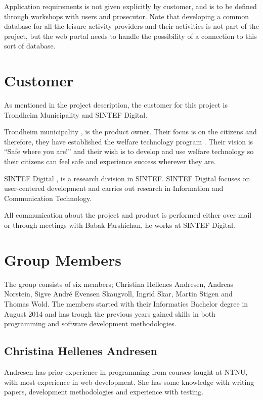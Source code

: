 Application requirements is not given explicitly by customer, and is to be defined through workshops with users and prosecutor. Note that developing a common database for all the leisure activity providers and their activities is not part of the project, but the web portal needs to handle the possibility of a connection to this sort of database.  


\section{Customer}
As mentioned in the project description, the customer for this project is Trondheim Municipality and SINTEF Digital. 

Trondheim municipality \cite{TrondheimMunicipality}, is the product owner. Their focus is on the citizens and therefore, they have established the welfare technology program \cite{WelfareProgram}. Their vision is “Safe where you are!” and their wish is to develop and use welfare technology so their citizens can feel safe and experience success wherever they are. 

SINTEF Digital \cite{SintefDigital}, is a research division in SINTEF. SINTEF Digital focuses on user-centered development and carries out research in Information and Communication Technology.

All communication about the project and product is performed either over mail or through meetings with Babak Farshichan, he works at SINTEF Digital.


\section{Group Members}
The group consists of six members; Christina Hellenes Andresen, Andreas Norstein, Sigve André Evensen Skaugvoll, Ingrid Skar, Martin Stigen and Thomas Wold. The members started with their Informatics Bachelor degree in August 2014 and has trough the previous years gained skills in both programming and software development methodologies. 

\subsection{Christina Hellenes Andresen}
Andresen has prior experience in programming from courses taught at NTNU, with most experience in web development. She has some knowledge with writing papers, development methodologies and experience with testing. 

